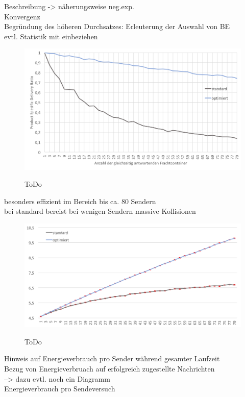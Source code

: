Beschreibung -> näherungsweise neg.exp. \\
Konvergenz \\
Begründung des höheren Durchsatzes: Erleuterung der Auswahl von BE \\
evtl. Statistik mit einbeziehen \\

\begin{figure}[bth]
        \myfloatalign
        {\includegraphics[width=1\linewidth]{gfx/Diag_Durchsatz_1_80}} 
        \caption[Durchsatz im Detail]{ToDo}\label{fig:diag_durchsatz_1_80}
\end{figure}

besonders effizient im Bereich bis ca. 80 Sendern \\
bei standard bereist bei wenigen Sendern massive Kollisionen

\begin{figure}[bth]
        \myfloatalign
        {\includegraphics[width=1\linewidth]{gfx/Diag_Energie_1_80}} 
        \caption[Energieverbrauch]{ToDo}\label{fig:diag_Energie_1_80}
\end{figure}

Hinweis auf Energieverbrauch pro Sender während gesamter Laufzeit \\
Bezug von Energieverbruach auf erfolgreich zugestellte Nachrichten\\
--> dazu evtl. noch ein Diagramm \\
Energieverbrauch pro Sendeversuch \\

